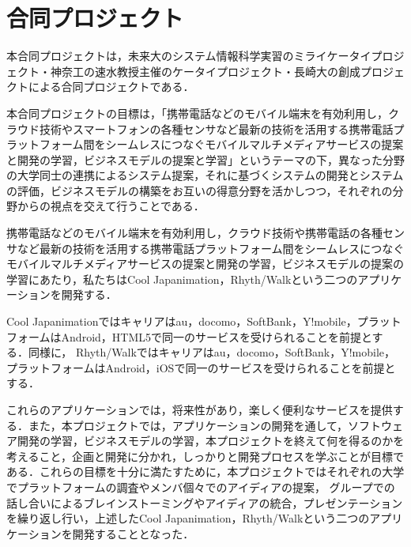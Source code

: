 \section{合同プロジェクト}
本合同プロジェクトは，未来大のシステム情報科学実習のミライケータイプロジェクト・神奈工の速水教授主催のケータイプロジェクト・長崎大の創成プロジェクトによる合同プロジェクトである．
\par
本合同プロジェクトの目標は，「携帯電話などのモバイル端末を有効利用し，クラウド技術やスマートフォンの各種センサなど最新の技術を活用する携帯電話プラットフォーム間をシームレスにつなぐモバイルマルチメディアサービスの提案と開発の学習，ビジネスモデルの提案と学習」というテーマの下，異なった分野の大学同士の連携によるシステム提案，それに基づくシステムの開発とシステムの評価，ビジネスモデルの構築をお互いの得意分野を活かしつつ，それぞれの分野からの視点を交えて行うことである．
\par
携帯電話などのモバイル端末を有効利用し，クラウド技術や携帯電話の各種センサなど最新の技術を活用する携帯電話プラットフォーム間をシームレスにつなぐモバイルマルチメディアサービスの提案と開発の学習，ビジネスモデルの提案の学習にあたり，私たちはCool Japanimation，Rhyth/Walkという二つのアプリケーションを開発する．
\par
Cool Japanimationではキャリアはau，docomo，SoftBank，Y!mobile，プラットフォームはAndroid，HTML5で同一のサービスを受けられることを前提とする．同様に，
Rhyth/Walkではキャリアはau，docomo，SoftBank，Y!mobile，プラットフォームはAndroid，iOSで同一のサービスを受けられることを前提とする．
\par
これらのアプリケーションでは，将来性があり，楽しく便利なサービスを提供する．また，本プロジェクトでは，アプリケーションの開発を通して，ソフトウェア開発の学習，ビジネスモデルの学習，本プロジェクトを終えて何を得るのかを考えること，企画と開発に分かれ，しっかりと開発プロセスを学ぶことが目標である．これらの目標を十分に満たすために，本プロジェクトではそれぞれの大学でプラットフォームの調査やメンバ個々でのアイディアの提案， グループでの話し合いによるブレインストーミングやアイディアの統合，プレゼンテーションを繰り返し行い，上述したCool Japanimation，Rhyth/Walkという二つのアプリケーションを開発することとなった．
